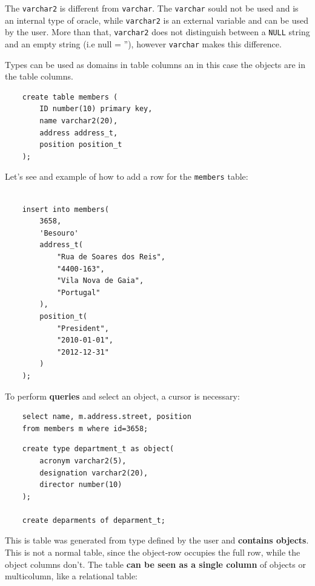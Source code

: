 \begin{tcolorbox} 
    The \texttt{varchar2} is different from \texttt{varchar}. The \texttt{varchar} sould not be used and is an internal type of oracle, while \texttt{varchar2} is an external variable and can be used by the user. More than that, \texttt{varchar2} does not distinguish between a \texttt{NULL} string and an empty string (i.e null = ''), however \texttt{varchar} makes this difference. 
\end{tcolorbox} 


Types can be used as domains in table columns an in this case the objects are in the table columns.

\begin{lstlisting}
    create table members (
        ID number(10) primary key,
        name varchar2(20),
        address address_t,
        position position_t
    );
\end{lstlisting}

Let's see and example of how to add a row for the \texttt{members} table: 

\begin{lstlisting}

    insert into members(
        3658,
        'Besouro'
        address_t(
            "Rua de Soares dos Reis",
            "4400-163",
            "Vila Nova de Gaia",
            "Portugal"
        ),
        position_t(
            "President",
            "2010-01-01",
            "2012-12-31"
        )
    );
\end{lstlisting}

To perform \textbf{queries} and select an object, a cursor is necessary:

\begin{lstlisting}
    select name, m.address.street, position
    from members m where id=3658;
\end{lstlisting} 


\begin{lstlisting}
    create type department_t as object(
        acronym varchar2(5),
        designation varchar2(20),
        director number(10)
    );

    create deparments of deparment_t;
\end{lstlisting}

This is table was generated from type defined by the user and \textbf{contains objects}. This is not a normal table, since the object-row occupies the full row, while the object columns don't. The table \textbf{can be seen as a single column} of objects or multicolumn, like a relational table:

